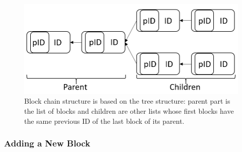 \documentclass[runningheads,a4paper]{llncs}
\begin{document}
\begin{figure}[!htbp]
	\centering
	\includegraphics[scale = 0.3]{image/BlockChainStructure}
	\caption{Block chain structure is based on the tree structure: parent part is the list of blocks and children are other lists whose first blocks have the same previous ID of the last block of its parent.}
	\label{BCStructure}
\end{figure}

\subsubsection{Adding a New Block}
\end{document}

